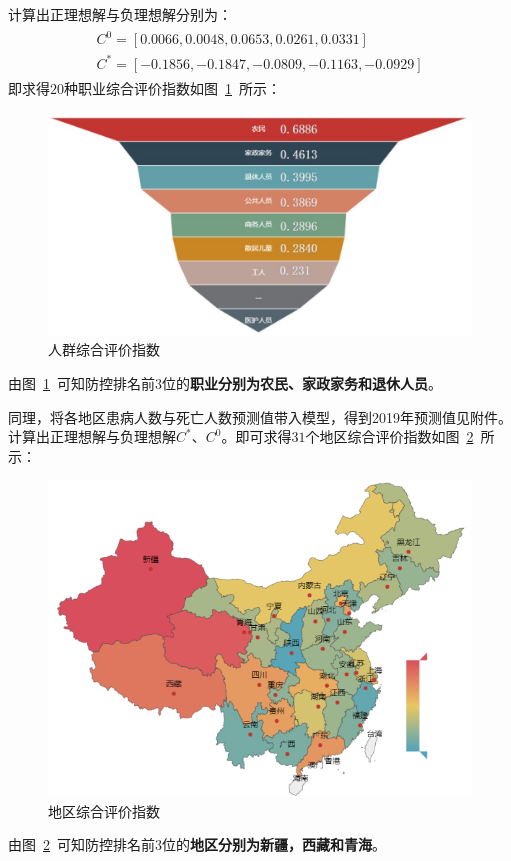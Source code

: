 \documentclass{whutmod}
\begin{document}
    计算出正理想解与负理想解分别为：
\begin{gather*}
\begin{matrix}
C^{0}=[0.0066,0.0048,0.0653,0.0261,0.0331]\\
C^{*}=[-0.1856,-0.1847,-0.0809,-0.1163,-0.0929]
\end{matrix}
\end{gather*}
    即求得$20$种职业综合评价指数如图~\ref{oc}~所示：
    \begin{figure}[H]
    	\centering
    	\includegraphics[width=.9\textwidth]{figures/oc.png}
    	\caption{人群综合评价指数}\label{oc}
    \end{figure}
	由图~\ref{oc}~可知防控排名前$3$位的\textbf{职业分别为农民、家政家务和退休人员}。


    
   同理，将各地区患病人数与死亡人数预测值带入模型，得到2019年预测值见附件。计算出正理想解与负理想解$
   C^{*}$、$C^{0}$。即可求得$31$个地区综合评价指数如图~\ref{area}~所示：
   \begin{figure}[H]
   	\centering
   	\includegraphics[width=\textwidth]{figures/area.png}
   	\caption{地区综合评价指数}\label{area}
   \end{figure}
   由图~\ref{area}~可知防控排名前$3$位的\textbf{地区分别为新疆，西藏和青海}。
\end{document}
